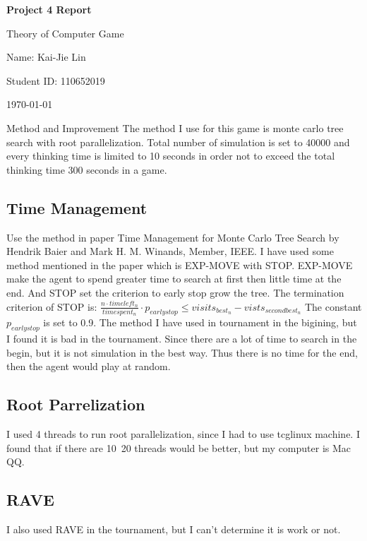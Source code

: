 \documentclass{article} %
\newcommand{\question}[2][]{\begin{flushleft}\textbf{Question #1}: \textit{#2}\end{flushleft}}
\newcommand{\maketitletwo}[2][]{\begin{center}
        \Large{\textbf{Project 4 Report}
        
            Theory of Computer Game} %
        \vspace{5pt}
        
        \normalsize{
            Name: Kai-Jie Lin 
            
            Student ID: 110652019
            
            \today}
        \vspace{15pt}
        \end{center}}
\begin{document}
    \maketitletwo[5]  %
    
    \section{Method and Improvement} 
    The method I use for this game is monte carlo tree search with root parallelization. Total number of simulation is set to 
    40000 and every thinking time is limited to 10 seconds in order not to exceed the total thinking time 300 seconds in a game.
    \subsection*{Time Management}
    Use the method in paper Time Management for Monte Carlo Tree Search by Hendrik Baier and Mark H. M. Winands, Member, IEEE.
    I have used some method mentioned in the paper which is EXP-MOVE with STOP. EXP-MOVE make the agent to spend greater time to 
    search at first then little time at the end. And STOP set the criterion to early stop grow the tree. 
    The termination criterion of STOP is: $ \frac{n \cdot timeleft_n}{timespent_{n}} \cdot p_{earlystop} \le visits_{best_{n}} - vists_{secondbest_{n}}$
    The constant $p_{earlystop}$ is set to 0.9. The method I have used in tournament in the bigining, but I found it is bad in the tournament.
    Since there are a lot of time to search in the begin, but it is not simulation in the best way. Thus there is no time for the end, then the agent would play at random.
    \subsection*{Root Parrelization}
    I used 4 threads to run root parallelization, since I had to use tcglinux machine. I found that if there are 10~20 threads would be better, but my computer is Mac QQ.
    \subsection*{RAVE}
    I also used RAVE in the tournament, but I can't determine it is work or not.
\end{document}
